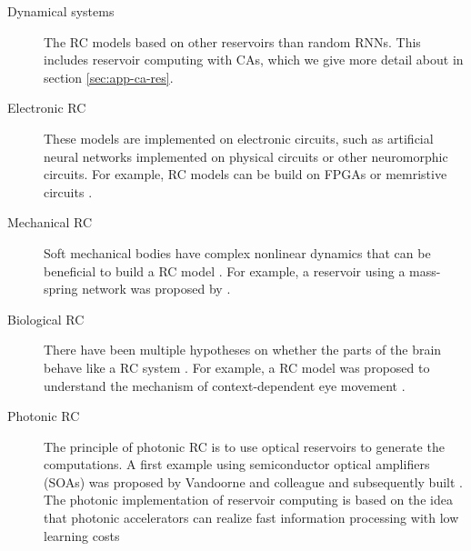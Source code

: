 \begin{description}
  \item[Dynamical systems] The \ac{RC} models based on other reservoirs than
        random \acp{RNN}. This includes reservoir computing with \aclp{CA},
        which we give more detail about in section \ref{sec:app-ca-res}.
  \item[Electronic \ac{RC}] These models are implemented on electronic circuits,
        such as artificial neural networks implemented on physical circuits or
        other neuromorphic circuits. For example, \ac{RC} models can be build on
        FPGAs \parencite{antonikApplicationFPGAReal2018,
        verstraetenReservoirComputingStochastic2005,
        alomarLowcostHardwareImplementation2014,
        antonikFPGAImplementationReservoir2015} or memristive circuits
        \parencite{yangInvestigationsStaircaseMemristor2016,
        merkelMemristiveReservoirComputing2014,
        donahueDesignAnalysisNeuromemristive2015}.
  \item[Mechanical \ac{RC}] Soft mechanical bodies have complex nonlinear
        dynamics that can be beneficial to build a \ac{RC} model
        \parencite{pfeiferHowBodyShapes2007}. For example, a reservoir using a
        mass-spring network was proposed by
        \textcite{hauserTheoreticalFoundationMorphological2011}.
  \item[Biological \ac{RC}] There have been multiple hypotheses on whether the
        parts of the brain behave like a \ac{RC} system
        \parencite{yamazakiCerebellumLiquidState2007}. For example, a \ac{RC}
        model was proposed to understand the mechanism of context-dependent eye
        movement \parencite{domineyComplexSensorymotorSequence1995,
        domineyModelCorticostriatalPlasticity1995}.
  \item[Photonic \ac{RC}] The principle of photonic \ac{RC} is to use optical
        reservoirs to generate the computations. A first example using
        semiconductor optical amplifiers (SOAs) was proposed by
        Vandoorne and colleague \parencite{vandoorneOpticalSignalProcessing2008,
        vandoorneParallelReservoirComputing2011} and subsequently built \parencite{vandoorneExperimentalDemonstrationReservoir2014}.
        The photonic implementation of reservoir computing is based on the idea that
        photonic accelerators \parencite{kitayamaNovelFrontierPhotonics2019} can
        realize fast information processing with low
        learning costs \parencite{paquotOptoelectronicReservoirComputing2012,
        martinenghiPhotonicNonlinearTransient2012,
}
\end{description}
